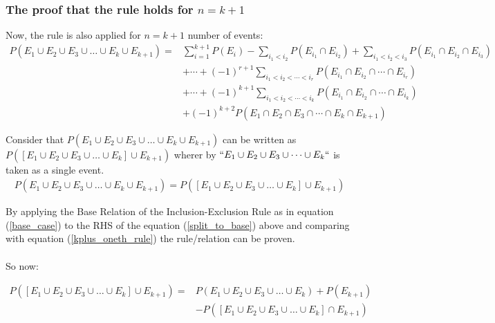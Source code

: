 \documentclass[a4paper]{article}
\begin{document}
    \subsubsection*{The proof that the rule holds for $n = k + 1$}
    Now, the rule is also applied for $n = k + 1$ number of events:
    \begin{equation} \label{kplus_oneth_rule}
        \begin{split}
            P(E_1 \cup E_2 \cup E_3 \cup \dots \cup E_k \cup E_{k + 1}) = & \sum_{i = 1}^{k + 1} P(E_i) - \sum_{i_1 < i_2} P(E_{i_1} \cap E_{i_2}) + \sum_{i_1 < i_2 < i_3} P(E_{i_1} \cap E_{i_2} \cap E_{i_3}) \\
            & + \cdots + {(-1)}^{r + 1} \sum_{i_1 < i_2 < \cdots < i_r} P(E_{i_1} \cap E_{i_2} \cap \cdots \cap E_{i_r}) \\
            & + \cdots + {(-1)}^{k + 1} \sum_{i_1 < i_2 < \cdots < i_{k}} P(E_{i_1} \cap E_{i_2} \cap \cdots \cap E_{i_k}) \\
            & + {(-1)}^{k + 2} P(E_1 \cap E_2 \cap E_3 \cap \cdots \cap E_k \cap E_{k + 1})
        \end{split}
    \end{equation}

    Consider that $P(E_1 \cup E_2 \cup E_3 \cup \dots \cup E_k \cup E_{k + 1})$ can be written as $P([E_1 \cup E_2 \cup E_3 \cup \dots \cup E_k] \cup E_{k + 1})$ wherer by $``E_1 \cup E_2 \cup E_3 \cup \dots \cup E_k``$ is taken as a single event.
    \begin{equation} \label{split_to_base}
        \begin{split}
            P(E_1 \cup E_2 \cup E_3 \cup \dots \cup E_k \cup E_{k + 1}) = P([E_1 \cup E_2 \cup E_3 \cup \dots \cup E_k] \cup E_{k + 1})
        \end{split}
    \end{equation}

    By applying the Base Relation of the Inclusion-Exclusion Rule as in equation (\ref{base_case}) to the RHS of the equation (\ref{split_to_base}) above and comparing with equation (\ref{kplus_oneth_rule}) the rule/relation can be proven.

    \paragraph*{}So now:

    \begin{equation} \label{base_kplus_one}
        \begin{split}
            P([E_1 \cup E_2 \cup E_3 \cup \dots \cup E_k] \cup E_{k + 1}) = & P(E_1 \cup E_2 \cup E_3 \cup \dots \cup E_k) + P(E_{k + 1}) \\
            & - P([E_1 \cup E_2 \cup E_3 \cup \dots \cup E_k] \cap E_{k + 1})
        \end{split}
    \end{equation}
\end{document}
